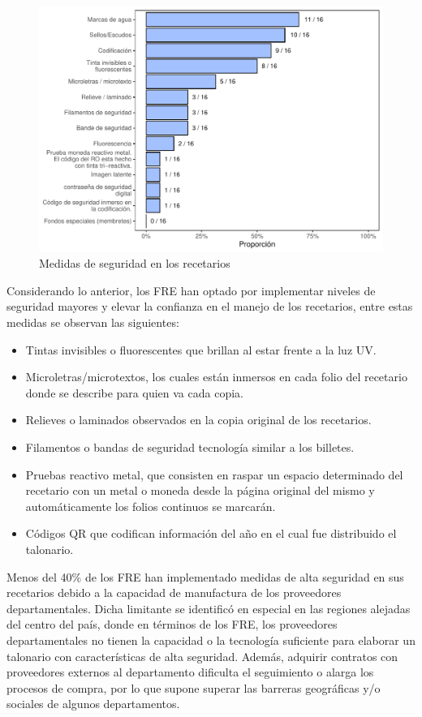 \documentclass[
]{book}
\begin{document}
\begin{figure}

{\centering \includegraphics[width=0.9\linewidth]{InformeFinal_files/figure-latex/MedidasSeguridadRec-1} 

}

\caption{Medidas de seguridad en los recetarios}\label{fig:MedidasSeguridadRec}
\end{figure}

Considerando lo anterior, los FRE han optado por implementar niveles de seguridad mayores y elevar la confianza en el manejo de los recetarios, entre estas medidas se observan las siguientes:

\begin{itemize}
\item
  Tintas invisibles o fluorescentes que brillan al estar frente a la luz UV.
\item
  Microletras/microtextos, los cuales están inmersos en cada folio del recetario donde se describe para quien va cada copia.
\item
  Relieves o laminados observados en la copia original de los recetarios.
\item
  Filamentos o bandas de seguridad tecnología similar a los billetes.
\item
  Pruebas reactivo metal, que consisten en raspar un espacio determinado del recetario con un metal o moneda desde la página original del mismo y automáticamente los folios continuos se marcarán.
\item
  Códigos QR que codifican información del año en el cual fue distribuido el talonario.
\end{itemize}

Menos del 40\% de los FRE han implementado medidas de alta seguridad en sus recetarios debido a la capacidad de manufactura de los proveedores departamentales. Dicha limitante se identificó en especial en las regiones alejadas del centro del país, donde en términos de los FRE, los proveedores departamentales no tienen la capacidad o la tecnología suficiente para elaborar un talonario con características de alta seguridad. Además, adquirir contratos con proveedores externos al departamento dificulta el seguimiento o alarga los procesos de compra, por lo que supone superar las barreras geográficas y/o sociales de algunos departamentos.
\end{document}
